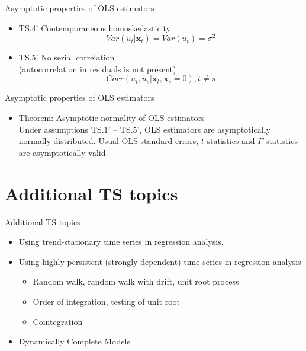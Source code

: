\documentclass{beamer}
\begin{document}

\begin{frame}{Asymptotic properties of OLS estimators}
\begin{itemize}
\item TS.4' Contemporaneous homoskedasticity
$$Var(u_t|\boldsymbol{x}_t)=Var(u_t)=\sigma^2$$

\vspace{0.5cm}

\item TS.5' No serial correlation \\(autocorrelation in residuals is not present)
$$Corr(u_t,u_s|\boldsymbol{x}_t,\boldsymbol{x}_s=0), t\neq s$$
\end{itemize}
\end{frame}


\begin{frame}{Asymptotic properties of OLS estimators}
\begin{itemize}
\item Theorem: Asymptotic normality of OLS estimators \\
\vspace{0.5cm}
Under assumptions TS.1' – TS.5', OLS estimators are asymptotically normally distributed. Usual OLS standard errors, $t$-statistics and $F$-statistics are asymptotically valid.
\end{itemize}
\end{frame}


\section{Additional TS topics}
\begin{frame}{Additional TS topics}
\begin{itemize}
\item Using trend-stationary time series in regression analysis.

\vspace{0.5cm}

\item Using highly persistent (strongly dependent) time series in regression analysis
\begin{itemize}
\item Random walk, random walk with drift, unit root
process
\item Order of integration, testing of unit root
\item Cointegration
\end{itemize}

\vspace{0.5cm}

\item Dynamically Complete Models
\end{itemize}
\end{frame}
\end{document}
